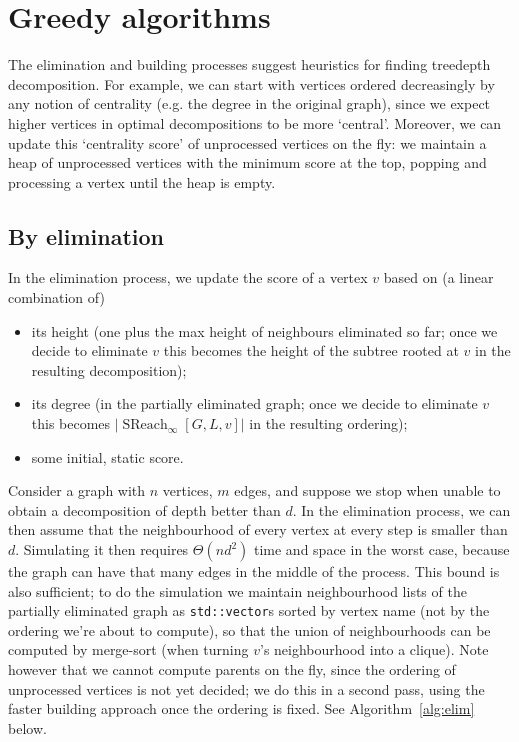 \documentclass{timgad}
\DeclareMathOperator{\SReach}{SReach}
\begin{document}
\section{Greedy algorithms}
The elimination and building processes suggest heuristics for finding treedepth decomposition.
For example, we can start with vertices ordered decreasingly by any notion of centrality (e.g. the degree in the original graph), since we expect higher vertices in optimal decompositions to be more `central'.
Moreover, we can update this `centrality score' of unprocessed vertices on the fly: we maintain a heap of unprocessed vertices with the minimum score at the top, popping and processing a vertex until the heap is empty.
\subsection{By elimination}
In the elimination process, we update the score of a vertex $v$ based on (a linear combination of) 
\begin{itemize}
\item its height (one plus the max height of neighbours eliminated so far; once we decide to eliminate $v$ this becomes the height of the subtree rooted at $v$ in the resulting decomposition);
\item its degree (in the partially eliminated graph; once we decide to eliminate $v$ this becomes $|\SReach_{\infty}[G,L,v]|$ in the resulting ordering);
\item some initial, static score.
\end{itemize} 

Consider a graph with $n$ vertices, $m$ edges, and suppose we stop when unable to obtain a decomposition of depth better than $d$.
In the elimination process, we can then assume that the neighbourhood of every vertex at every step is smaller than $d$.
Simulating it then requires $\Theta(nd^2)$ time and space in the worst case,
because the graph can have that many edges in the middle of the process.
This bound is also sufficient; to do the simulation we maintain neighbourhood lists of the partially eliminated graph
as \texttt{std::vector}s sorted by vertex name (not by the ordering we're about to compute), so that the union of neighbourhoods can be computed by merge-sort (when turning $v$'s neighbourhood into a clique).
Note however that we cannot compute parents on the fly, since the ordering of unprocessed vertices is not yet decided;
we do this in a second pass, using the faster building approach once the ordering is fixed.
See Algorithm~\ref{alg:elim} below.
\end{document}
